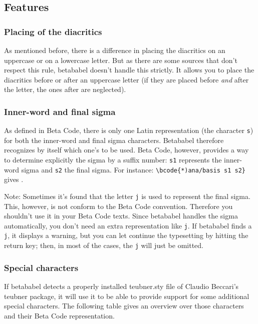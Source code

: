 \documentclass{article}
\begin{document}
\subsection{Features}
\subsubsection{Placing of the diacritics}
As mentioned before, there is a difference in placing the diacritics on an uppercase or on a lowercase letter. But as there are some sources that don't respect this rule, \textsf{betababel} doesn't handle this strictly. It allows you to place the diacritics before or after an uppercase letter (if they are placed before \emph{and} after the letter, the ones after are neglected).

\subsubsection{Inner-word and final sigma}
As defined in Beta Code, there is only one Latin representation (the character \texttt{s}) for both the inner-word and final sigma characters. \textsf{Betababel} therefore recognizes by itself which one's to be used. Beta Code, however, provides a way to determine explicitly the sigma by a suffix number: \texttt{s1} represents the inner-word sigma and \texttt{s2} the final sigma. For instance: \verb'\bcode{*)ana/basis s1 s2}' gives .

Note: Sometimes it's found that the letter \texttt{j} is used to represent the final sigma. This, however, is not conform to the Beta Code convention. Therefore you shouldn't use it in your Beta Code texts. Since \textsf{betababel} handles the sigma automatically, you don't need an extra representation like \texttt{j}. If \textsf{betababel} finds a \texttt{j}, it displays a warning, but you can let continue the typesetting by hitting the return key; then, in most of the cases, the \texttt{j} will just be omitted.

\subsubsection{Special characters}
\label{SpecChar}
If \textsf{betababel} detects a properly installed \textsf{teubner.sty} file of Claudio Beccari's \textsf{teubner} package, it will use it to be able to provide support for some additional special characters. The following table gives an overview over those characters and their Beta Code representation.
\end{document}
